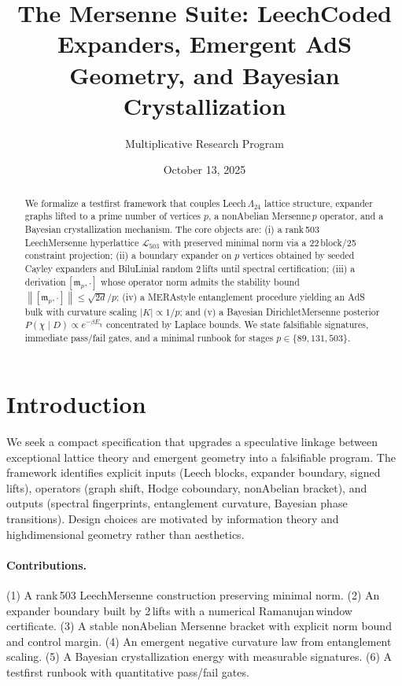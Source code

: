 \documentclass[11pt]{article}
\title{The Mersenne\textendash 503 Suite: Leech\textendash Coded Expanders, Emergent AdS Geometry, and Bayesian Crystallization}
\author{Multiplicative Research Program}
\date{October 13, 2025}
\theoremstyle{definition}
\newcommand{\LLeech}{\Lambda_{24}}
\newcommand{\Lproj}{\mathcal L_{503}}
\newcommand{\norm}[1]{\left\lVert #1 \right\rVert}
\begin{document}
\maketitle
\begin{abstract}
We formalize a test\textendash first framework that couples Leech\,\(\LLeech\) lattice structure, expander graphs lifted to a prime number of vertices \(p\), a non\textendash Abelian Mersenne\,\(p\) operator, and a Bayesian crystallization mechanism. The core objects are: (i) a rank\,503 Leech\textendash Mersenne hyperlattice \(\Lproj\) with preserved minimal norm via a 22\,block/25\,constraint projection; (ii) a boundary expander on \(p\) vertices obtained by seeded Cayley expanders and Bilu\textendash Linial random 2\,lifts until spectral certification; (iii) a derivation\,\([\mathfrak m_p,\cdot]\) whose operator norm admits the stability bound \(\norm{[\mathfrak m_p,\cdot]}\le \sqrt{2d}/p\); (iv) a MERA\textendash style entanglement procedure yielding an AdS bulk with curvature scaling \(|K|\propto 1/p\); and (v) a Bayesian Dirichlet\textendash Mersenne posterior \(P(\chi\mid D)\propto e^{-\beta E_\chi}\) concentrated by Laplace bounds. We state falsifiable signatures, immediate pass/fail gates, and a minimal runbook for stages \(p\in\{89,131,503\}\).
\end{abstract}

\tableofcontents

\section{Introduction}
We seek a compact specification that upgrades a speculative linkage between exceptional lattice theory and emergent geometry into a falsifiable program. The framework identifies explicit inputs (Leech blocks, expander boundary, signed lifts), operators (graph shift, Hodge coboundary, non\textendash Abelian bracket), and outputs (spectral fingerprints, entanglement curvature, Bayesian phase transitions). Design choices are motivated by information theory and high\textendash dimensional geometry rather than aesthetics.

\paragraph{Contributions.} (1) A rank\,503 Leech\textendash Mersenne construction preserving minimal norm. (2) An expander boundary built by 2\,lifts with a numerical Ramanujan\,window certificate. (3) A stable non\textendash Abelian Mersenne bracket with explicit norm bound and control margin. (4) An emergent negative curvature law from entanglement scaling. (5) A Bayesian crystallization energy with measurable signatures. (6) A test\textendash first runbook with quantitative pass/fail gates.
\end{document}
